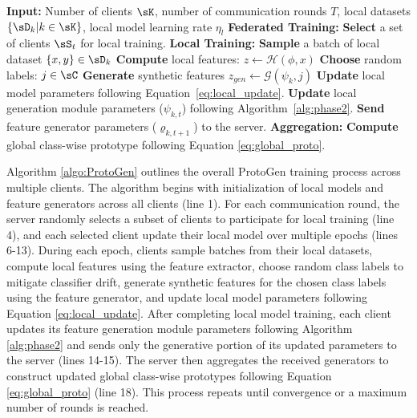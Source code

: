 \documentclass[lettersize,journal]{IEEEtran}
\begin{document}
\begin{algorithm}[t]
\caption{\textsf{ProtoGen}: Federated Privacy-Preserving Prototype Learning via Feature Generation}
\label{algo:ProtoGen}
\begin{algorithmic}[1]
    \State \textbf{Input:} Number of clients $\sK$, number of communication rounds $T$, local datasets $\{\sD_k|k \in \sK\}$, local model learning rate $\eta_l$    
    \State \textbf{Federated Training:}
        \State \textbf{Select} a set of clients $\sS_t$ for local training.
        \State \textbf{\textcolor{myred}{Local Training:}}
                \State \textbf{Sample} a batch of local dataset $\{ x , y\} \in \sD_k$
                \State \textbf{Compute} local features: $z \leftarrow \mathcal{H}(\phi, x)$
                \State \textbf{Choose} random labels: $j \in \sC$
                \State \textbf{Generate} synthetic features $z_{gen} \leftarrow \mathcal{G}(\psi_k, j) $
                \State \textbf{Update} local model parameters following Equation~\ref{eq:local_update}.
            \EndFor
            \State \textbf{Update} local generation module parameters ($\psi_{k,t}$) following Algorithm~\ref{alg:phase2}.
            \State \textbf{Send} feature generator parameters ($\varrho_{k,t+1}$) to the server.
        \EndFor
        \State \textbf{\textcolor{myred}{Aggregation:}}
        \State \textbf{Compute} global class-wise prototype following Equation \ref{eq:global_proto}.
    \EndFor

\end{algorithmic}
\end{algorithm}

Algorithm \ref{algo:ProtoGen} outlines the overall \textsf{ProtoGen} training process across multiple clients. The algorithm begins with initialization of local models and feature generators across all clients (line 1). For each communication round, the server randomly selects a subset of clients to participate for local training (line 4), and each selected client update their local model over multiple epochs (lines 6-13). During each epoch, clients sample batches from their local datasets, compute local features using the feature extractor, choose random class labels to mitigate classifier drift, generate synthetic features for the chosen class labels using the feature generator, and update local model parameters following Equation \ref{eq:local_update}. After completing local model training, each client updates its feature generation module parameters following Algorithm \ref{alg:phase2} and sends only the generative portion of its updated parameters to the server (lines 14-15). The server then aggregates the received generators to construct updated global class-wise prototypes following Equation \ref{eq:global_proto} (line 18). This process repeats until convergence or a maximum number of rounds is reached.
\end{document}
